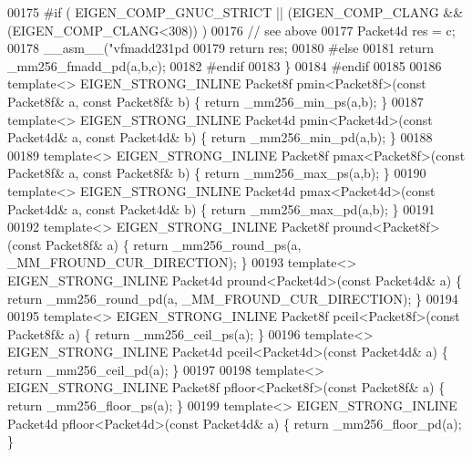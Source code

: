 \begin{DoxyCode}
{00175 \textcolor{preprocessor}{#if ( EIGEN\_COMP\_GNUC\_STRICT || (EIGEN\_COMP\_CLANG && (EIGEN\_COMP\_CLANG<308)) )}
00176   \textcolor{comment}{// see above}
00177   Packet4d res = c;
00178   \_\_asm\_\_(\textcolor{stringliteral}{"vfmadd231pd %
00179   \textcolor{keywordflow}{return} res;
00180 \textcolor{preprocessor}{#else}
00181   \textcolor{keywordflow}{return} \_mm256\_fmadd\_pd(a,b,c);
00182 \textcolor{preprocessor}{#endif}
00183 \}
00184 \textcolor{preprocessor}{#endif}
00185 
00186 \textcolor{keyword}{template}<> EIGEN\_STRONG\_INLINE Packet8f pmin<Packet8f>(\textcolor{keyword}{const} Packet8f& a, \textcolor{keyword}{const} Packet8f& b) \{ \textcolor{keywordflow}{return} 
      \_mm256\_min\_ps(a,b); \}
00187 \textcolor{keyword}{template}<> EIGEN\_STRONG\_INLINE Packet4d pmin<Packet4d>(\textcolor{keyword}{const} Packet4d& a, \textcolor{keyword}{const} Packet4d& b) \{ \textcolor{keywordflow}{return} 
      \_mm256\_min\_pd(a,b); \}
00188 
00189 \textcolor{keyword}{template}<> EIGEN\_STRONG\_INLINE Packet8f pmax<Packet8f>(\textcolor{keyword}{const} Packet8f& a, \textcolor{keyword}{const} Packet8f& b) \{ \textcolor{keywordflow}{return} 
      \_mm256\_max\_ps(a,b); \}
00190 \textcolor{keyword}{template}<> EIGEN\_STRONG\_INLINE Packet4d pmax<Packet4d>(\textcolor{keyword}{const} Packet4d& a, \textcolor{keyword}{const} Packet4d& b) \{ \textcolor{keywordflow}{return} 
      \_mm256\_max\_pd(a,b); \}
00191 
00192 \textcolor{keyword}{template}<> EIGEN\_STRONG\_INLINE Packet8f pround<Packet8f>(\textcolor{keyword}{const} Packet8f& a) \{ \textcolor{keywordflow}{return} \_mm256\_round\_ps(a, 
      \_MM\_FROUND\_CUR\_DIRECTION); \}
00193 \textcolor{keyword}{template}<> EIGEN\_STRONG\_INLINE Packet4d pround<Packet4d>(\textcolor{keyword}{const} Packet4d& a) \{ \textcolor{keywordflow}{return} \_mm256\_round\_pd(a, 
      \_MM\_FROUND\_CUR\_DIRECTION); \}
00194 
00195 \textcolor{keyword}{template}<> EIGEN\_STRONG\_INLINE Packet8f pceil<Packet8f>(\textcolor{keyword}{const} Packet8f& a) \{ \textcolor{keywordflow}{return} \_mm256\_ceil\_ps(a); \}
00196 \textcolor{keyword}{template}<> EIGEN\_STRONG\_INLINE Packet4d pceil<Packet4d>(\textcolor{keyword}{const} Packet4d& a) \{ \textcolor{keywordflow}{return} \_mm256\_ceil\_pd(a); \}
00197 
00198 \textcolor{keyword}{template}<> EIGEN\_STRONG\_INLINE Packet8f pfloor<Packet8f>(\textcolor{keyword}{const} Packet8f& a) \{ \textcolor{keywordflow}{return} \_mm256\_floor\_ps(a); \}
00199 \textcolor{keyword}{template}<> EIGEN\_STRONG\_INLINE Packet4d pfloor<Packet4d>(\textcolor{keyword}{const} Packet4d& a) \{ \textcolor{keywordflow}{return} \_mm256\_floor\_pd(a); \}
}}
\end{DoxyCode}
